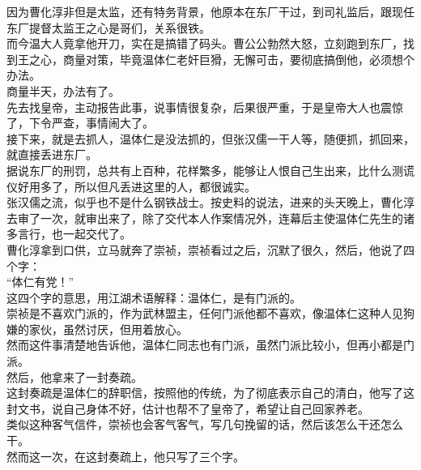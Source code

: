 \begin{multicols}{\theparacolNo}
因为曹化淳非但是太监，还有特务背景，他原本在东厂干过，到司礼监后，跟现任东厂提督太监王之心是哥们，关系很铁。\\

而今温大人竟拿他开刀，实在是搞错了码头。曹公公勃然大怒，立刻跑到东厂，找到王之心，商量对策，毕竟温体仁老奸巨猾，无懈可击，要彻底搞倒他，必须想个办法。\\

商量半天，办法有了。\\

先去找皇帝，主动报告此事，说事情很复杂，后果很严重，于是皇帝大人也震惊了，下令严查，事情闹大了。\\

接下来，就是去抓人，温体仁是没法抓的，但张汉儒一干人等，随便抓，抓回来，就直接丢进东厂。\\

据说东厂的刑罚，总共有上百种，花样繁多，能够让人恨自己生出来，比什么测谎仪好用多了，所以但凡丢进这里的人，都很诚实。\\

张汉儒之流，似乎也不是什么钢铁战士。按史料的说法，进来的头天晚上，曹化淳去审了一次，就审出来了，除了交代本人作案情况外，连幕后主使温体仁先生的诸多言行，也一起交代了。\\

曹化淳拿到口供，立马就奔了崇祯，崇祯看过之后，沉默了很久，然后，他说了四个字：\\

“体仁有党！”\\

这四个字的意思，用江湖术语解释：温体仁，是有门派的。\\

崇祯是不喜欢门派的，作为武林盟主，任何门派他都不喜欢，像温体仁这种人见狗嫌的家伙，虽然讨厌，但用着放心。\\

然而这件事清楚地告诉他，温体仁同志也有门派，虽然门派比较小，但再小都是门派。\\

然后，他拿来了一封奏疏。\\

这封奏疏是温体仁的辞职信，按照他的传统，为了彻底表示自己的清白，他写了这封文书，说自己身体不好，估计也帮不了皇帝了，希望让自己回家养老。\\

类似这种客气信件，崇祯也会客气客气，写几句挽留的话，然后该怎么干还怎么干。\\

然而这一次，在这封奏疏上，他只写了三个字。\\


\end{multicols}
